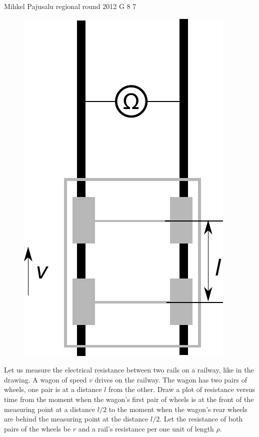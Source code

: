 \documentclass[11pt]{article}
\begin{document}
{Mihkel Pajusalu} %
{regional round} %
{2012} %
{G 8} %
{7} %
{

\ifEngStatement
\begin{figure}%
\vspace{-15pt}
\includegraphics[width=\linewidth]{2012-v2g-08-rong}%
\end{figure}
Let us measure the electrical resistance between two rails on a railway, like in the drawing. A wagon of speed $v$ drives on the railway. The wagon has two pairs of wheels, one pair is at a distance $l$ from the other. Draw a plot of resistance versus time from the moment when the wagon’s first pair of wheels is at the front of the measuring point at a distance $l/2$ to the moment when the wagon’s rear wheels are behind the measuring point at the distance $l/2$.  Let the resistance of both pairs of the wheels be $r$ and a rail’s resistance per one unit of length $\rho$.
\fi
}
\end{document}
